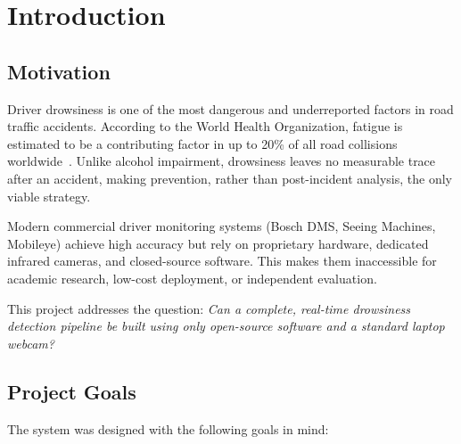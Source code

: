 \documentclass[12pt, a4paper]{article}
\begin{document}
\newpage

\vspace{0.5cm}
\tableofcontents
\newpage

\section{Introduction}

\subsection{Motivation}

Driver drowsiness is one of the most dangerous and underreported factors in
road traffic accidents. According to the World Health Organization, fatigue
is estimated to be a contributing factor in up to 20\% of all road collisions
worldwide~\cite{who2018}. Unlike alcohol impairment, drowsiness leaves no
measurable trace after an accident, making prevention, rather than
post-incident analysis, the only viable strategy.

Modern commercial driver monitoring systems (Bosch DMS, Seeing Machines,
Mobileye) achieve high accuracy but rely on proprietary hardware, dedicated
infrared cameras, and closed-source software. This makes them inaccessible
for academic research, low-cost deployment, or independent evaluation.

This project addresses the question: \textit{Can a complete, real-time
drowsiness detection pipeline be built using only open-source software and
a standard laptop webcam?}

\subsection{Project Goals}

The system was designed with the following goals in mind:
\end{document}
